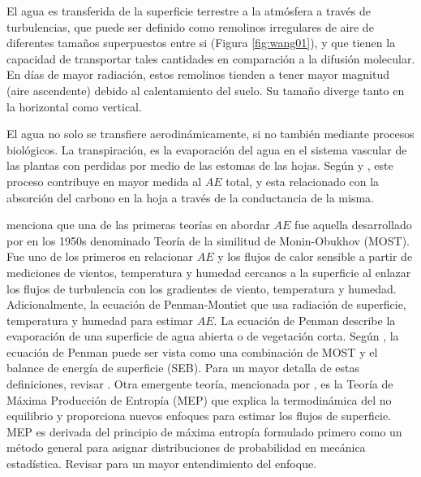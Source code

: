 \documentclass[12pt]{article}
\begin{document}
El agua es transferida de la superficie terrestre a la atmósfera a través de turbulencias, que puede ser definido como remolinos irregulares de aire de diferentes tamaños superpuestos entre si (Figura \ref{fig:wang01}), y que tienen la capacidad de transportar tales cantidades en comparación a la difusión molecular. En días de mayor radiación, estos remolinos tienden a tener mayor magnitud (aire ascendente) debido al calentamiento del suelo. Su tamaño diverge tanto en la horizontal como vertical. 



El agua no solo se transfiere aerodinámicamente, si no también mediante procesos biológicos. La transpiración, es la evaporación del agua en el sistema vascular de las plantas con perdidas por medio de las estomas de las hojas. Según \citet{dirmeyer2006gswp} y \citet{lawrence2007partitioning}, este proceso contribuye en mayor medida al $AE$ total, y esta relacionado con la absorción del carbono en la hoja a través de la conductancia de la misma.



\citet{wang2012review} menciona que una de las primeras teorías en abordar $AE$ fue aquella desarrollado por \citet{monin1954basic} en los 1950s denominado Teoría de la similitud de Monin-Obukhov (MOST). Fue uno de los primeros en relacionar $AE$ y los flujos de calor sensible a partir de mediciones de vientos, temperatura y humedad cercanos a la superficie al enlazar los flujos de turbulencia con los gradientes de viento, temperatura y humedad. Adicionalmente, la ecuación de Penman-Montiet \citep{penman1948natural,monteith1965evaporation} que usa radiación de superficie, temperatura y humedad para estimar $AE$. La ecuación de Penman describe la evaporación de una superficie de agua abierta o de vegetación corta. Según \citet{wang2012review}, la ecuación de Penman puede ser vista como una combinación de MOST y el balance de energía de superficie (SEB). Para un mayor detalla de estas definiciones, revisar \citet{wang2012review}. Otra emergente teoría, mencionada por \citet{zhang2016review}, es la Teoría de Máxima Producción de Entropía (MEP) que explica la termodinámica del no equilibrio y proporciona nuevos enfoques para estimar los flujos de superficie. MEP es derivada del principio de máxima entropía formulado primero como un método general para asignar distribuciones de probabilidad en mecánica estadística. Revisar \citet{zhang2016review} para un mayor entendimiento del enfoque. 
\end{document}
